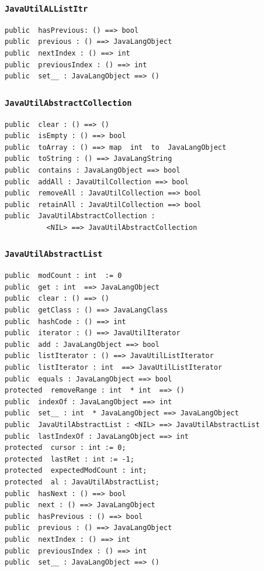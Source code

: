 \documentclass[\pformat,12pt]{article}
\begin{document}
\subsubsection{\texttt{JavaUtilALListItr}}
\begin{small}
\begin{verbatim}
public  hasPrevious: () ==> bool
public  previous : () ==> JavaLangObject
public  nextIndex : () ==> int
public  previousIndex : () ==> int
public  set__ : JavaLangObject ==> ()
\end{verbatim}
\end{small}

\subsubsection{\texttt{JavaUtilAbstractCollection}}
\begin{small}
\begin{verbatim}
public  clear : () ==> ()
public  isEmpty : () ==> bool
public  toArray : () ==> map  int  to  JavaLangObject
public  toString : () ==> JavaLangString
public  contains : JavaLangObject ==> bool
public  addAll : JavaUtilCollection ==> bool
public  removeAll : JavaUtilCollection ==> bool
public  retainAll : JavaUtilCollection ==> bool
public  JavaUtilAbstractCollection : 
          <NIL> ==> JavaUtilAbstractCollection
\end{verbatim}
\end{small}

\subsubsection{\texttt{JavaUtilAbstractList}}
\begin{small}
\begin{verbatim}
public  modCount : int  := 0
public  get : int  ==> JavaLangObject
public  clear : () ==> ()
public  getClass : () ==> JavaLangClass
public  hashCode : () ==> int
public  iterator : () ==> JavaUtilIterator
public  add : JavaLangObject ==> bool
public  listIterator : () ==> JavaUtilListIterator
public  listIterator : int  ==> JavaUtilListIterator
public  equals : JavaLangObject ==> bool
protected  removeRange : int  * int  ==> ()
public  indexOf : JavaLangObject ==> int
public  set__ : int  * JavaLangObject ==> JavaLangObject
public  JavaUtilAbstractList : <NIL> ==> JavaUtilAbstractList
public  lastIndexOf : JavaLangObject ==> int
protected  cursor : int := 0;
protected  lastRet : int := -1;
protected  expectedModCount : int;
protected  al : JavaUtilAbstractList;
public  hasNext : () ==> bool
public  next : () ==> JavaLangObject
public  hasPrevious : () ==> bool
public  previous : () ==> JavaLangObject
public  nextIndex : () ==> int
public  previousIndex : () ==> int
public  set__ : JavaLangObject ==> ()
\end{verbatim}
\end{small}
\end{document}
